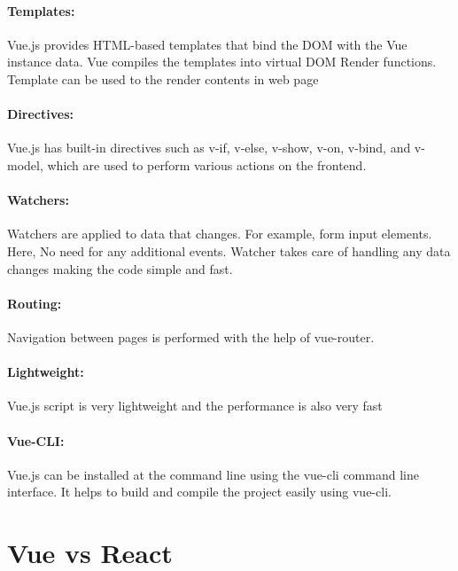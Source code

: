 \documentclass[12pt,a4paper,oneside]{report}
\begin{document}
\paragraph{Templates:}

Vue.js provides HTML-based templates that bind the DOM with the Vue instance data. Vue compiles the templates into virtual DOM Render functions. Template can be used to the render contents in web page

\paragraph{Directives:}

Vue.js has built-in directives such as v-if, v-else, v-show, v-on, v-bind, and v-model, which are used to perform various actions on the frontend.

\paragraph{Watchers:}

Watchers are applied to data that changes. For example, form input elements. Here, No need for any additional events. Watcher takes care of handling any data changes making the code simple and fast.

\paragraph{Routing:}

Navigation between pages is performed with the help of vue-router.

\paragraph{Lightweight:}

Vue.js script is very lightweight and the performance is also very fast

\paragraph{Vue-CLI:}

Vue.js can be installed at the command line using the vue-cli command line interface. It helps to build and compile the project easily using vue-cli.
\newpage
\section{Vue vs React}
\end{document}
